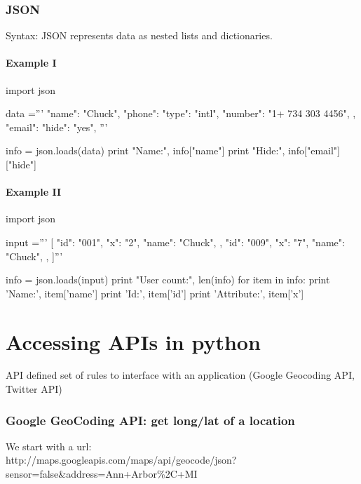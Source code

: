\documentclass[a4paper,12pt]{report}
\begin{document}
\section{JSON}
Syntax: JSON represents data as nested lists and dictionaries.
\subsection{Example I}
\begin{tcolorbox}
\begin{python}
import json

data =''' {  %
			"name": "Chuck",  %
			"phone": { 
				"type": "intl",
				"number": "1+ 734 303 4456",
			},
			"email": {
				"hide": "yes",
			}
		}'''

info = json.loads(data) %
print "Name:", info["name"]  %
print "Hide:", info["email"]["hide"]  %
\end{python}
\end{tcolorbox}

\subsection{Example II}
\begin{tcolorbox}
\begin{python}
import json

input =''' [  %
			{ "id": "001", %
				"x": "2",
				"name": "Chuck",
			},
			{ "id": "009",
				"x": "7",
				"name": "Chuck",
			},
		]'''

info = json.loads(input) %
print "User count:", len(info)
for item in info:
	print 'Name:', item['name']
	print 'Id:', item['id']
	print 'Attribute:', item['x']
\end{python}
\end{tcolorbox}

\part{Accessing APIs in python}
API defined set of rules to interface with an application (Google Geocoding API, Twitter API)
\section{Google GeoCoding API: get long/lat of a location}
We start with a url:\\
http://maps.googleapis.com/maps/api/geocode/json?sensor=false\&address=Ann+Arbor\%2C+MI \\
\end{document}
